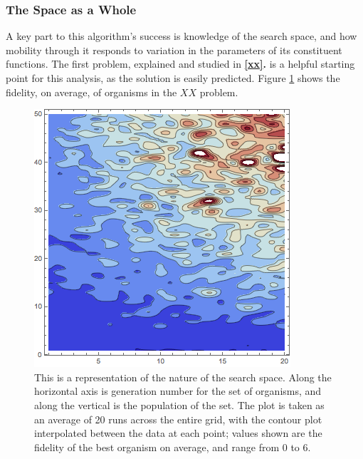 \documentclass[11pt,twocolumn]{article}
\begin{document}



	\subsubsection{The Space as a Whole}
    
    A key part to this algorithm's success is knowledge of the search space, and how mobility through it responds to variation in the parameters of its constituent functions. The first problem, explained and studied in \textbf{\ref{xx}.} is a helpful starting point for this analysis, as the solution is easily predicted. Figure \ref{fig:tot_plot} shows the fidelity, on average, of organisms in the $XX$ problem.

	\begin{figure}[htpb]
		\centering
			\includegraphics[scale=0.6]{genPlot_50O_20G.png}
		\centering
		\caption{This is a representation of the nature of the search space. Along the horizontal axis is generation number for the set of organisms, and along the vertical is the population of the set. The plot is taken as an average of 20 runs across the entire grid, with the contour plot interpolated between the data at each point; values shown are the fidelity of the best organism on average, and range from 0 to 6.}
		\label{fig:tot_plot}
	\end{figure}
    
\end{document}
